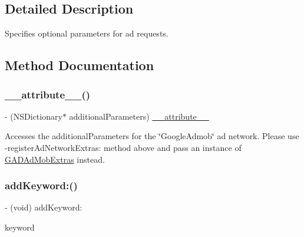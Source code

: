 \subsection{Detailed Description}
Specifies optional parameters for ad requests. 

\subsection{Method Documentation}
\mbox{\label{interfaceGADRequest_a9005c9237b61a20c67a29516c1781985}} 
\subsubsection{\texorpdfstring{\+\_\+\+\_\+attribute\+\_\+\+\_\+()}{\_\_attribute\_\_()}}
{\footnotesize\ttfamily -\/ (N\+S\+Dictionary$\ast$ additional\+Parameters) \hyperlink{struct____attribute____}{\+\_\+\+\_\+attribute\+\_\+\+\_\+} \begin{DoxyParamCaption}\item[{((deprecated(\char`\"{} use \hyperlink{interfaceGADRequest_acaa89d7cc5abf9313c039bc91bf09359}{register\+Ad\+Network\+Extras\+:} and pass an instance of G\+A\+D\+Ad\+Mob\+Extras.\char`\"{})))}]{ }\end{DoxyParamCaption}}

Accesses the additional\+Parameters for the \char`\"{}\+Google\+Admob\char`\"{} ad network. Please use -\/register\+Ad\+Network\+Extras\+: method above and pass an instance of \hyperlink{interfaceGADAdMobExtras}{G\+A\+D\+Ad\+Mob\+Extras} instead. \mbox{\label{interfaceGADRequest_abc6e22f79dfc076fdb9bb00ca5d47c3a}} 
\subsubsection{\texorpdfstring{add\+Keyword\+:()}{addKeyword:()}}
{\footnotesize\ttfamily -\/ (void) add\+Keyword\+: \begin{DoxyParamCaption}\item[{(N\+S\+String $\ast$)}]{keyword }\end{DoxyParamCaption}}

